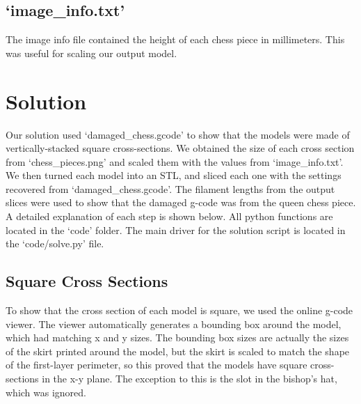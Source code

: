 \documentclass{IEEEtran}
\begin{document}
        \subsection{`image\_info.txt'}
            The image info file contained the height of each chess piece in millimeters.  This was useful for scaling our output model.

    \section{Solution}
         Our solution used `damaged\_chess.gcode' to show that the models were made of vertically-stacked square cross-sections.
          We obtained the size of each cross section from
        `chess\_pieces.png' and scaled them with the values from `image\_info.txt'.  
        We then turned each model into an STL, and sliced each one with the settings recovered from
        `damaged\_chess.gcode'.  The filament lengths from the output slices were used to show that the damaged g-code was from the queen chess piece.
        A detailed explanation of each step is shown below.  All python functions are located in the `code' folder.  The main driver for the solution script
        is located in the `code/solve.py' file.
        
        \subsection{Square Cross Sections}
            To show that the cross section of each model is square, we used the online g-code viewer.  The viewer automatically generates a bounding box
            around the model, which had matching x and y sizes.  The bounding box sizes are actually the sizes of the skirt printed around the model, but the skirt is scaled to
            match the shape of the first-layer perimeter, so this proved that the models have square cross-sections in the x-y plane.  The exception to this is the slot in the 
            bishop's hat, which was ignored.
        
\end{document}
